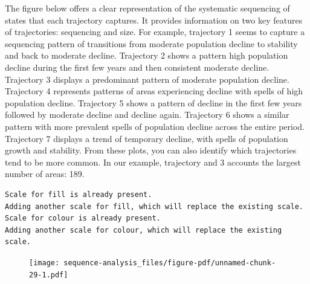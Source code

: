\documentclass[
  letterpaper,
  DIV=11,
  numbers=noendperiod]{scrreprt}
\newenvironment{Shaded}{\begin{snugshade}}{\end{snugshade}}
\newcommand{\AttributeTok}[1]{\textcolor[rgb]{0.40,0.45,0.13}{#1}}
\newcommand{\CommentTok}[1]{\textcolor[rgb]{0.37,0.37,0.37}{#1}}
\newcommand{\DecValTok}[1]{\textcolor[rgb]{0.68,0.00,0.00}{#1}}
\newcommand{\FunctionTok}[1]{\textcolor[rgb]{0.28,0.35,0.67}{#1}}
\newcommand{\NormalTok}[1]{\textcolor[rgb]{0.00,0.23,0.31}{#1}}
\newcommand{\SpecialCharTok}[1]{\textcolor[rgb]{0.37,0.37,0.37}{#1}}
\begin{document}
The figure below offers a clear representation of the systematic
sequencing of states that each trajectory captures. It provides
information on two key features of trajectories: sequencing and size.
For example, trajectory 1 seems to capture a sequencing pattern of
transitions from moderate population decline to stability and back to
moderate decline. Trajectory 2 shows a pattern high population decline
during the first few years and then consistent moderate decline.
Trajectory 3 displays a predominant pattern of moderate population
decline. Trajectory 4 represents patterns of areas experiencing decline
with spells of high population decline. Trajectory 5 shows a pattern of
decline in the first few years followed by moderate decline and decline
again. Trajectory 6 shows a similar pattern with more prevalent spells
of population decline across the entire period. Trajectory 7 displays a
trend of temporary decline, with spells of population growth and
stability. From these plots, you can also identify which trajectories
tend to be more common. In our example, trajectory and 3 accounts the
largest number of areas: 189.

\begin{Shaded}
\end{Shaded}

\begin{verbatim}
Scale for fill is already present.
Adding another scale for fill, which will replace the existing scale.
Scale for colour is already present.
Adding another scale for colour, which will replace the existing scale.
\end{verbatim}

\begin{figure}[H]

{\centering \texttt{[image: sequence-analysis\_files/figure-pdf/unnamed-chunk-29-1.pdf]}

}

\end{figure}
\end{document}
